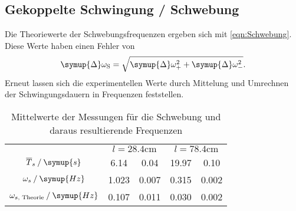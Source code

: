 \subsection{Gekoppelte Schwingung / Schwebung}
\label{subsec:Schwebung}
Die Theoriewerte der Schwebungsfrequenzen ergeben sich mit \autoref{eqn:Schwebung}. Diese Werte haben einen Fehler von
\begin{equation*}
    \label{eqn:DeltaOmega_s}
    \symup{\Delta}\omega_{\text{S}} = \sqrt{\symup{\Delta}\omega_+^2 + \symup{\Delta}\omega_-^2}.
\end{equation*}
Erneut lassen sich die experimentellen Werte durch Mittelung und Umrechnen der Schwingungsdauern in Frequenzen feststellen.

\begin{table}
    \centering
    \caption{Mittelwerte der Messungen für die Schwebung und daraus resultierende Frequenzen}
    \begin{tabular}{c S @{${}\pm{}$} S S[table-format=2.3] @{${}\pm{}$} S[table-format=1.3]}
    \toprule
    &  &  \\
    \cmidrule(lr){2-3}\cmidrule(lr){4-5}
    {$\overline{T}_s \mathbin{/} \symup{s}$}                & 6.14  & 0.04  & 19.97 & 0.10 \\
    {$\omega_s \mathbin{/} \symup{Hz}$}                     & 1.023 & 0.007 & 0.315 & 0.002 \\
    {$\omega_{{s}\text{, Theorie}} \mathbin{/} \symup{Hz}$} & 0.107 & 0.011 & 0.030 & 0.002 \\
    \bottomrule
    \end{tabular}
\end{table}